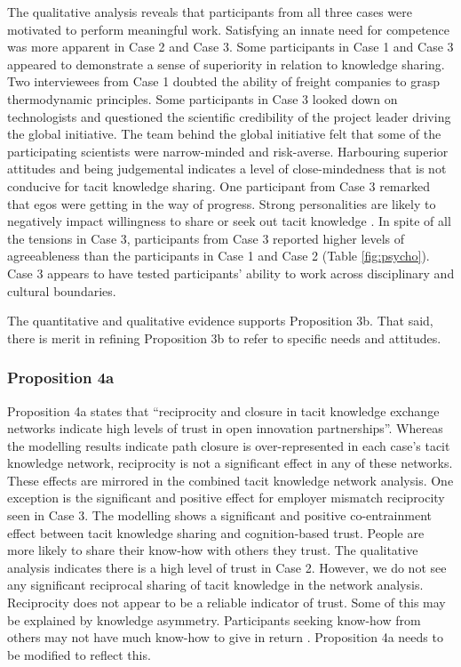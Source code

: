 The qualitative analysis reveals that participants from all three cases were motivated to perform meaningful work. Satisfying an innate need for competence was more apparent in Case 2 and Case 3. Some participants in Case 1 and Case 3 appeared to demonstrate a sense of superiority in relation to knowledge sharing. Two interviewees from Case 1 doubted the ability of freight companies to grasp thermodynamic principles. Some participants in Case 3 looked down on technologists and questioned the scientific credibility of the project leader driving the global initiative. The team behind the global initiative felt that some of the participating scientists were narrow-minded and risk-averse. Harbouring superior attitudes and being judgemental indicates a level of close-mindedness that is not conducive for tacit knowledge sharing. One participant from Case 3 remarked that egos were getting in the way of progress. Strong personalities are likely to negatively impact willingness to share or seek out tacit knowledge \citep{borges2012tacit}. In spite of all the tensions in Case 3, participants from Case 3 reported higher levels of agreeableness than the participants in Case 1 and Case 2 (Table \ref{fig:psycho}). Case 3 appears to have tested participants' ability to work across disciplinary and cultural boundaries. \medskip

The quantitative and qualitative evidence supports Proposition 3b. That said, there is merit in refining Proposition 3b to refer to specific needs and attitudes. 

\subsubsection{Proposition 4a}

Proposition 4a states that \enquote{reciprocity and closure in tacit knowledge exchange networks indicate high levels of trust in open innovation partnerships}. Whereas the modelling results indicate path closure is over-represented in each case's tacit knowledge network, reciprocity is not a significant effect in any of these networks. These effects are mirrored in the combined tacit knowledge network analysis. One exception is the significant and positive effect for employer mismatch reciprocity seen in Case 3. The modelling shows a significant and positive co-entrainment effect between tacit knowledge sharing and cognition-based trust. People are more likely to share their know-how with others they trust. The qualitative analysis indicates there is a high level of trust in Case 2. However, we do not see any significant reciprocal sharing of tacit knowledge in the network analysis. Reciprocity does not appear to be a reliable indicator of trust. Some of this may be explained by knowledge asymmetry. Participants seeking know-how from others may not have much know-how to give in return \citep{hahl2016knowledge,tell2017managing}. Proposition 4a needs to be modified to reflect this.

